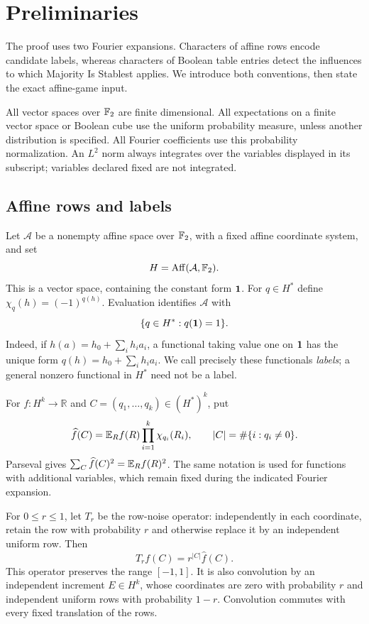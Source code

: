 \section{Preliminaries}\label{sec:preliminaries}

The proof uses two Fourier expansions. Characters of affine rows encode
candidate labels, whereas characters of Boolean table entries detect the
influences to which Majority Is Stablest applies. We introduce both
conventions, then state the exact affine-game input.

All vector spaces over $\mathbb F_2$ are finite dimensional. All expectations on a
finite vector space or Boolean cube use the uniform probability measure,
unless another distribution is specified. All Fourier coefficients use
this probability normalization. An $L^2$ norm always integrates over the
variables displayed in its subscript; variables declared fixed are not
integrated.

\subsection{Affine rows and labels}

Let $\mathcal A$ be a nonempty affine space over $\mathbb F_2$, with a fixed affine
coordinate system, and set
\[
 H=\operatorname{Aff}(\mathcal A,\mathbb F_2).
\]
This is a vector space, containing the constant form $\mathbf 1$.
For $q\in H^*$ define $\chi_q(h)=(-1)^{q(h)}$.
Evaluation identifies $\mathcal A$ with
\begin{equation}\label{eq:labels-dual}
 \{q\in H^*:q(\mathbf 1)=1\}.
\end{equation}
Indeed, if $h(a)=h_0+\sum_i h_i a_i$, a functional taking value one on
$\mathbf 1$ has the unique form $q(h)=h_0+\sum_i h_i a_i$.
We call precisely these functionals \emph{labels}; a general nonzero
functional in $H^*$ need not be a label.

For $f:H^k\to\mathbb R$ and $C=(q_1,\ldots,q_k)\in(H^*)^k$, put
\[
 \widehat f(C)=\mathbb E_R f(R)\prod_{i=1}^k\chi_{q_i}(R_i),\qquad
 |C|=\#\{i:q_i\ne0\}.
\]
Parseval gives $\sum_C\widehat f(C)^2=\mathbb E_R f(R)^2$.
The same notation is used for functions with additional variables, which
remain fixed during the indicated Fourier expansion.

For $0\le r\le1$, let $T_r$ be the row-noise operator: independently in each
coordinate, retain the row with probability $r$ and otherwise replace it
by an independent uniform row. Then
\begin{equation}\label{eq:row-noise}
 \widehat{T_rf}(C)=r^{|C|}\widehat f(C).
\end{equation}
This operator preserves the range $[-1,1]$. It is also convolution by an
independent increment $E\in H^k$, whose coordinates are zero with
probability $r$ and independent uniform rows with probability $1-r$.
Convolution commutes with every fixed translation of the rows.

